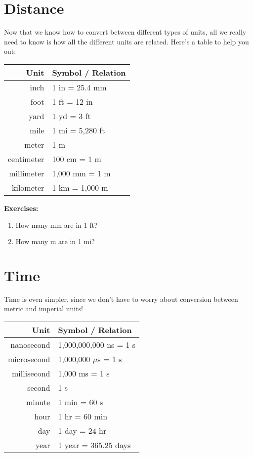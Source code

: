 \documentclass[12pt, letterpaper]{article}
\begin{document}
\clearpage


\section{Distance}
Now that we know how to convert between different types of units, all we really need to know is how all the different units are related.
Here's a table to help you out:


\begin{centering}
	
\begin{tabular}{r|l}
\textbf{Unit}&\textbf{Symbol / Relation}\\
\hline
inch & 1 in = 25.4 mm\\
foot & 1 ft = 12 in\\
yard & 1 yd = 3 ft\\
mile & 1 mi = 5,280 ft\\
meter & 1 m\\
centimeter & 100 cm = 1 m\\
millimeter & 1,000 mm = 1 m\\
kilometer & 1 km = 1,000 m
\end{tabular}

\end{centering}


\textbf{Exercises:}

\begin{enumerate}
\item How many mm are in 1 ft?

\answergrid{5cm}

\item How many m are in 1 mi?

\answergrid{5cm}
\end{enumerate}

\clearpage

\section{Time}
Time is even simpler, since we don't have to worry about conversion between metric and imperial units!

\begin{centering}
	
\begin{tabular}{r|l}
\textbf{Unit}&\textbf{Symbol / Relation}\\
\hline
nanosecond & 1,000,000,000 ns = 1 s\\
microsecond & 1,000,000 $\mu$s = 1 s\\
millisecond & 1,000 ms = 1 s\\
second & 1 s\\
minute & 1 min = 60 s\\
hour & 1 hr = 60 min\\
day & 1 day = 24 hr\\
year & 1 year = 365.25 days
\end{tabular}

\end{centering}
\end{document}
